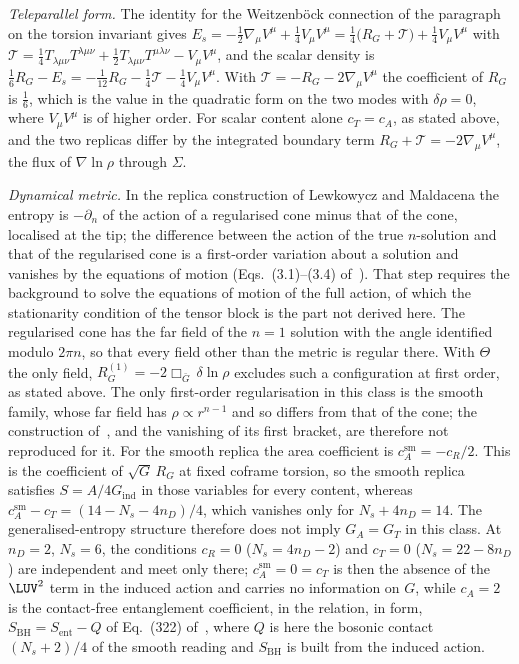\emph{Teleparallel form.} The identity for the Weitzenb\"ock connection of the paragraph on the torsion invariant gives \(E_s=-\tfrac12\nabla_\mu V^\mu+\tfrac14V_\mu V^\mu=\tfrac14\bigl(R_G+\mathcal T\bigr)+\tfrac14V_\mu V^\mu\) with \(\mathcal T=\tfrac14T_{\lambda\mu\nu}T^{\lambda\mu\nu}+\tfrac12T_{\lambda\mu\nu}T^{\mu\lambda\nu}-V_\mu V^\mu\), and the scalar density is \(\tfrac16R_G-E_s=-\tfrac1{12}R_G-\tfrac14\mathcal T-\tfrac14V_\mu V^\mu\). With \(\mathcal T=-R_G-2\nabla_\mu V^\mu\) the coefficient of \(R_G\) is \(\tfrac16\), which is the value in the quadratic form on the two modes with \(\delta\rho=0\), where \(V_\mu V^\mu\) is of higher order. For scalar content alone \(c_T=c_A\), as stated above, and the two replicas differ by the integrated boundary term \(R_G+\mathcal T=-2\nabla_\mu V^\mu\), the flux of \(\nabla\ln\rho\) through \(\Sigma\).

\emph{Dynamical metric.} In the replica construction of Lewkowycz and Maldacena the entropy is \(-\partial_n\) of the action of a regularised cone minus that of the cone, localised at the tip; the difference between the action of the true \(n\)-solution and that of the regularised cone is a first-order variation about a solution and vanishes by the equations of motion (Eqs.~(3.1)--(3.4) of~\cite{LewkowyczMaldacena2013}). That step requires the background to solve the equations of motion of the full action, of which the stationarity condition of the tensor block is the part not derived here. The regularised cone has the far field of the \(n=1\) solution with the angle identified modulo \(2\pi n\), so that every field other than the metric is regular there. With \(\Theta\) the only field, \(R_G^{(1)}=-2\Box_{\bar G}\,\delta\ln\rho\) excludes such a configuration at first order, as stated above. The only first-order regularisation in this class is the smooth family, whose far field has \(\rho\propto r^{n-1}\) and so differs from that of the cone; the construction of~\cite{LewkowyczMaldacena2013}, and the vanishing of its first bracket, are therefore not reproduced for it. For the smooth replica the area coefficient is \(c_A^{\mathrm{sm}}=-c_R/2\). This is the coefficient of \(\sqrt G\,R_G\) at fixed coframe torsion, so the smooth replica satisfies \(S=A/4G_{\mathrm{ind}}\) in those variables for every content, whereas \(c_A^{\mathrm{sm}}-c_T=(14-N_s-4n_D)/4\), which vanishes only for \(N_s+4n_D=14\). The generalised-entropy structure therefore does not imply \(G_A=G_T\) in this class. At \(n_D=2\), \(N_s=6\), the conditions \(c_R=0\) (\(N_s=4n_D-2\)) and \(c_T=0\) (\(N_s=22-8n_D\)) are independent and meet only there; \(c_A^{\mathrm{sm}}=0=c_T\) is then the absence of the \(\LUV^2\) term in the induced action and carries no information on \(G\), while \(c_A=2\) is the contact-free entanglement coefficient, in the relation, in form, \(S_{\mathrm{BH}}=S_{\mathrm{ent}}-Q\) of Eq.~(322) of~\cite{Solodukhin2011}, where \(Q\) is here the bosonic contact \((N_s+2)/4\) of the smooth reading and \(S_{\mathrm{BH}}\) is built from the induced action.

